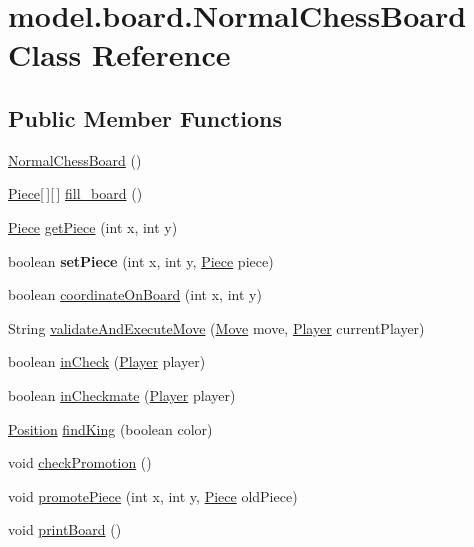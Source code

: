 \hypertarget{classmodel_1_1board_1_1_normal_chess_board}{\section{model.\-board.\-Normal\-Chess\-Board Class Reference}
\label{classmodel_1_1board_1_1_normal_chess_board}
}
\subsection*{Public Member Functions}
\begin{DoxyCompactItemize}
\item 
\hyperlink{classmodel_1_1board_1_1_normal_chess_board_acfebd2179c723222db56862facc60198}{Normal\-Chess\-Board} ()
\item 
\hyperlink{classmodel_1_1piece_1_1_piece}{Piece}\mbox{[}$\,$\mbox{]}\mbox{[}$\,$\mbox{]} \hyperlink{classmodel_1_1board_1_1_normal_chess_board_a5ba6bbd045a881a061237021e4df1e72}{fill\-\_\-board} ()
\item 
\hyperlink{classmodel_1_1piece_1_1_piece}{Piece} \hyperlink{classmodel_1_1board_1_1_normal_chess_board_a56df672de8539b26360d0afd0325c4c6}{get\-Piece} (int x, int y)
\item 
\hypertarget{classmodel_1_1board_1_1_normal_chess_board_a042587085ae575e7008d2e34ad8d3f8a}{boolean {\bfseries set\-Piece} (int x, int y, \hyperlink{classmodel_1_1piece_1_1_piece}{Piece} piece)}\label{classmodel_1_1board_1_1_normal_chess_board_a042587085ae575e7008d2e34ad8d3f8a}

\item 
boolean \hyperlink{classmodel_1_1board_1_1_normal_chess_board_ad1a7f2d7ae6bca92f08b921eeb61975c}{coordinate\-On\-Board} (int x, int y)
\item 
String \hyperlink{classmodel_1_1board_1_1_normal_chess_board_ad6c2729da8f3070e706c2286f87a279e}{validate\-And\-Execute\-Move} (\hyperlink{classmodel_1_1_move}{Move} move, \hyperlink{classmodel_1_1player_1_1_player}{Player} current\-Player)
\item 
boolean \hyperlink{classmodel_1_1board_1_1_normal_chess_board_a8831075b8adda3e79d232918f1857129}{in\-Check} (\hyperlink{classmodel_1_1player_1_1_player}{Player} player)
\item 
boolean \hyperlink{classmodel_1_1board_1_1_normal_chess_board_aed1f285c6ebcb4ee46bb5563ce3bad54}{in\-Checkmate} (\hyperlink{classmodel_1_1player_1_1_player}{Player} player)
\item 
\hyperlink{classmodel_1_1_position}{Position} \hyperlink{classmodel_1_1board_1_1_normal_chess_board_a1a1799ca4e0dbc672624de5a05da74fe}{find\-King} (boolean color)
\item 
void \hyperlink{classmodel_1_1board_1_1_normal_chess_board_a028510c42796367618fc2cccdf3c1259}{check\-Promotion} ()
\item 
void \hyperlink{classmodel_1_1board_1_1_normal_chess_board_a528dff37d7a3640f8cbb7379cb16e97d}{promote\-Piece} (int x, int y, \hyperlink{classmodel_1_1piece_1_1_piece}{Piece} old\-Piece)
\item 
void \hyperlink{classmodel_1_1board_1_1_normal_chess_board_a6ed0beb4493ca105f49281b8fa02bdd1}{print\-Board} ()
\end{DoxyCompactItemize}

